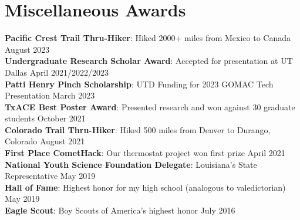 \documentclass[letterpaper,11pt]{article}
\begin{document}
\section{Miscellaneous Awards}
 \begin{itemize}[leftmargin=0.15in, label={}]
    \small{\item{
     \textbf{Pacific Crest Trail Thru-Hiker}{: Hiked 2000+ miles from Mexico to Canada} \hspace{120 pt}August 2023\\
     \textbf{Undergraduate Research Scholar Award}{: Accepted for presentation at UT Dallas} \hspace{45 pt}April 2021/2022/2023 \\
     \textbf{Patti Henry Pinch Scholarship}{: UTD Funding for 2023 GOMAC Tech Presentation} \hspace{87 pt}March 2023 \\
     \textbf{TxACE Best Poster Award}{: Presented research and won against 30 graduate students} \hspace{70 pt}October 2021\\
     \textbf{Colorado Trail Thru-Hiker}{: Hiked 500 miles from Denver to Durango, Colorado} \hspace{103 pt}August 2021\\
     \textbf{First Place CometHack}{: Our thermostat project won first prize} \hspace{186 pt}April 2021\\
     \textbf{National Youth Science Foundation Delegate}{: Louisiana's State Representative} \hspace{106 pt}May 2019\\
     \textbf{Hall of Fame}{: Highest honor for my high school (analogous to valedictorian)} \hspace{138 pt}May 2019\\
     \textbf{Eagle Scout}{: Boy Scouts of America's highest honor} \hspace{246 pt}July 2016
    }}
 \end{itemize}
\end{document}
